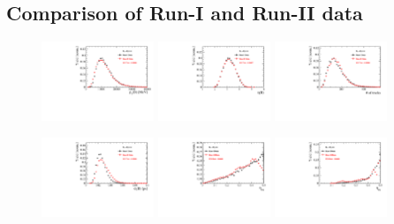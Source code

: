 \clearpage
\subsection*{Comparison of Run-I and Run-II data}

\begin{figure}[h]
\centering
\includegraphics[height=!,width=0.3\textwidth]{figs/dataVsMC/run1vs2_norm/Ds2all_Bs_PT.pdf}
\includegraphics[height=!,width=0.3\textwidth]{figs/dataVsMC/run1vs2_norm/Ds2all_Bs_ETA.pdf}
\includegraphics[height=!,width=0.3\textwidth]{figs/dataVsMC/run1vs2_norm/Ds2all_NTracks.pdf}


\includegraphics[height=!,width=0.3\textwidth]{figs/dataVsMC/run1vs2_norm/Ds2all_Bs_BsDTF_TAUERR.pdf}
\includegraphics[height=!,width=0.3\textwidth]{figs/dataVsMC/run1vs2_norm/Ds2all_OS_Combination_PROB.pdf}
\includegraphics[height=!,width=0.3\textwidth]{figs/dataVsMC/run1vs2_norm/Ds2all_SS_Kaon_PROB.pdf}



\end{figure}

